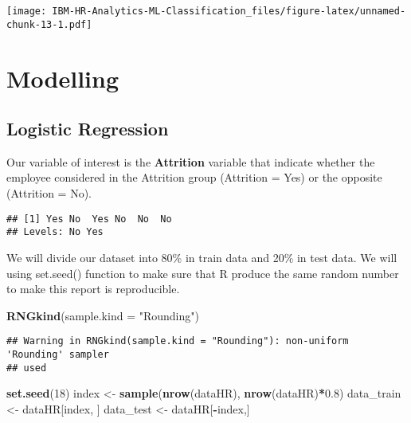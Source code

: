 \documentclass[
]{article}
\newenvironment{Shaded}{\begin{snugshade}}{\end{snugshade}}
\newcommand{\DataTypeTok}[1]{\textcolor[rgb]{0.13,0.29,0.53}{#1}}
\newcommand{\DecValTok}[1]{\textcolor[rgb]{0.00,0.00,0.81}{#1}}
\newcommand{\FloatTok}[1]{\textcolor[rgb]{0.00,0.00,0.81}{#1}}
\newcommand{\KeywordTok}[1]{\textcolor[rgb]{0.13,0.29,0.53}{\textbf{#1}}}
\newcommand{\NormalTok}[1]{#1}
\newcommand{\OperatorTok}[1]{\textcolor[rgb]{0.81,0.36,0.00}{\textbf{#1}}}
\newcommand{\StringTok}[1]{\textcolor[rgb]{0.31,0.60,0.02}{#1}}
\begin{document}
\texttt{[image: IBM-HR-Analytics-ML-Classification\_files/figure-latex/unnamed-chunk-13-1.pdf]}

\hypertarget{modelling}{%
\section{Modelling}\label{modelling}}

\hypertarget{logistic-regression}{%
\subsection{Logistic Regression}\label{logistic-regression}}

Our variable of interest is the \textbf{Attrition} variable that
indicate whether the employee considered in the Attrition group
(Attrition = Yes) or the opposite (Attrition = No).

\begin{Shaded}
\end{Shaded}

\begin{verbatim}
## [1] Yes No  Yes No  No  No 
## Levels: No Yes
\end{verbatim}

We will divide our dataset into 80\% in train data and 20\% in test
data. We will using set.seed() function to make sure that R produce the
same random number to make this report is reproducible.

\begin{Shaded}
\begin{Highlighting}[]
\KeywordTok{RNGkind}\NormalTok{(}\DataTypeTok{sample.kind =} \StringTok{"Rounding"}\NormalTok{)}
\end{Highlighting}
\end{Shaded}

\begin{verbatim}
## Warning in RNGkind(sample.kind = "Rounding"): non-uniform 'Rounding' sampler
## used
\end{verbatim}

\begin{Shaded}
\begin{Highlighting}[]
\KeywordTok{set.seed}\NormalTok{(}\DecValTok{18}\NormalTok{)}
\NormalTok{index <-}\StringTok{ }\KeywordTok{sample}\NormalTok{(}\KeywordTok{nrow}\NormalTok{(dataHR), }\KeywordTok{nrow}\NormalTok{(dataHR)}\OperatorTok{*}\FloatTok{0.8}\NormalTok{)}
\NormalTok{data_train <-}\StringTok{ }\NormalTok{dataHR[index, ]}
\NormalTok{data_test <-}\StringTok{ }\NormalTok{dataHR[}\OperatorTok{-}\NormalTok{index,]}
\end{Highlighting}
\end{Shaded}
\end{document}

